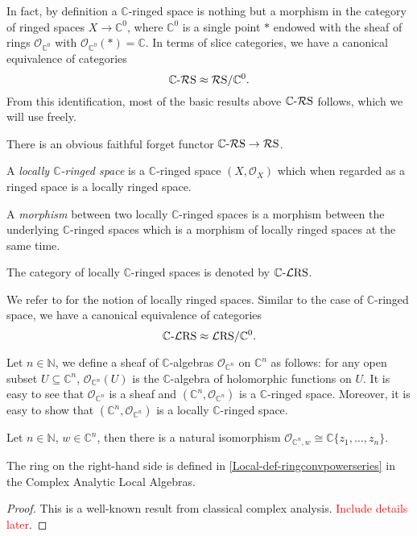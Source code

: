 In fact, by definition a $\mathbb{C}$-ringed space is nothing but a morphism in the category of ringed spaces $X\rightarrow \mathbb{C}^0$, where $\mathbb{C}^0$ is a single point $*$ endowed with the sheaf of rings $\mathcal{O}_{\mathbb{C}^0}$ with $\mathcal{O}_{\mathbb{C}^0}(*)=\mathbb{C}$. In terms of slice categories, we have a canonical equivalence of categories 
\[
    \mathbb{C}\text{-}\mathcal{R}\mathrm{S}\approx\mathcal{R}\mathrm{S}/\mathbb{C}^0. 
\]
From this identification, most of the basic results above $\mathbb{C}\text{-}\mathcal{R}\mathrm{S}$ follows, which we will use freely.

There is an obvious faithful forget functor $\mathbb{C}\text{-}\mathcal{R}\mathrm{S}\rightarrow \mathcal{R}\mathrm{S}$.


\begin{definition}
    A \emph{locally $\mathbb{C}$-ringed space} is a $\mathbb{C}$-ringed space $(X,\mathcal{O}_X)$ which when regarded as a ringed space is a locally ringed space.

    A \emph{morphism} between two locally $\mathbb{C}$-ringed spaces is a morphism between the underlying $\mathbb{C}$-ringed spaces which is a morphism of locally ringed spaces at the same time.

    The category of locally $\mathbb{C}$-ringed spaces is denoted by $\mathbb{C}\text{-}\mathcal{L}\mathrm{RS}$.
\end{definition}
We refer to \cite[\href{https://stacks.math.columbia.edu/tag/01HA}{Tag 01HA}]{stacks-project} for the notion of locally ringed spaces. Similar to the case of $\mathbb{C}$-ringed space, we have a canonical equivalence of categories
\[
    \mathbb{C}\text{-}\mathcal{L}\mathrm{RS}\approx\mathcal{L}\mathrm{RS}/\mathbb{C}^0. 
\]

\begin{example}\label{ex-Cnringed}
    Let $n\in \mathbb{N}$, we define a sheaf of $\mathbb{C}$-algebras $\mathcal{O}_{\mathbb{C}^n}$ on $\mathbb{C}^n$ as follows: for any open subset $U\subseteq \mathbb{C}^n$, $\mathcal{O}_{\mathbb{C}^n}(U)$ is the $\mathbb{C}$-algebra of holomorphic functions on $U$. It is easy to see that $\mathcal{O}_{\mathbb{C}^n}$ is a sheaf and $(\mathbb{C}^n,\mathcal{O}_{\mathbb{C}^n})$ is a $\mathbb{C}$-ringed space. Moreover, it is easy to show that $(\mathbb{C}^n,\mathcal{O}_{\mathbb{C}^n})$ is a locally $\mathbb{C}$-ringed space.
\end{example}

\begin{proposition}\label{prop-Cnlocalring}
    Let $n\in \mathbb{N}$, $w\in \mathbb{C}^n$, then there is a natural isomorphism $\mathcal{O}_{\mathbb{C}^n,w}\cong \mathbb{C}\{ z_1,\ldots,z_n\}$.
\end{proposition}
The ring on the right-hand side is defined  in 
\cref{Local-def-ringconvpowerseries} in the Complex Analytic Local Algebras.
\begin{proof}
    This is a well-known result from classical complex analysis. \textcolor{red}{Include details later}.
\end{proof}


